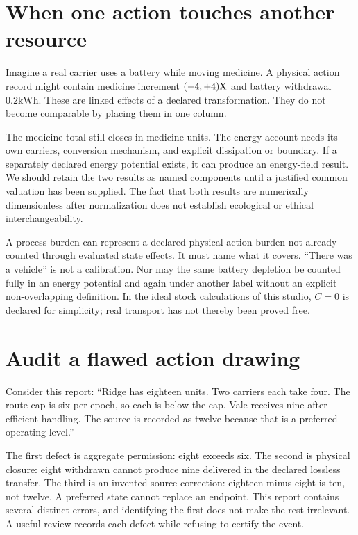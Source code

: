 \section{When one action touches another resource}

Imagine a real carrier uses a battery while moving medicine. A physical action record might contain medicine increment \((-4,+4)\mathrm{X}\) and battery withdrawal \(0.2\mathrm{kWh}\). These are linked effects of a declared transformation. They do not become comparable by placing them in one column.

The medicine total still closes in medicine units. The energy account needs its own carriers, conversion mechanism, and explicit dissipation or boundary. If a separately declared energy potential exists, it can produce an energy-field result. We should retain the two results as named components until a justified common valuation has been supplied. The fact that both results are numerically dimensionless after normalization does not establish ecological or ethical interchangeability.

A process burden can represent a declared physical action burden not already counted through evaluated state effects. It must name what it covers. ``There was a vehicle'' is not a calibration. Nor may the same battery depletion be counted fully in an energy potential and again under another label without an explicit non-overlapping definition. In the ideal stock calculations of this studio, \(C=0\) is declared for simplicity; real transport has not thereby been proved free.

\section{Audit a flawed action drawing}

Consider this report: ``Ridge has eighteen units. Two carriers each take four. The route cap is six per epoch, so each is below the cap. Vale receives nine after efficient handling. The source is recorded as twelve because that is a preferred operating level.''

The first defect is aggregate permission: eight exceeds six. The second is physical closure: eight withdrawn cannot produce nine delivered in the declared lossless transfer. The third is an invented source correction: eighteen minus eight is ten, not twelve. A preferred state cannot replace an endpoint. This report contains several distinct errors, and identifying the first does not make the rest irrelevant. A useful review records each defect while refusing to certify the event.

